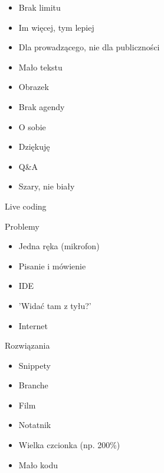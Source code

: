 \documentclass{beamer}
\begin{document}
\begin{frame}{}
	\begin{Large}
		\begin{itemize}
			\item Brak limitu
			\item Im więcej, tym lepiej
			\item Dla prowadzącego, nie dla publiczności
			\item Mało tekstu
			\item Obrazek
			\item Brak agendy
			\item O sobie
			\item Dziękuję
			\item Q\&A
			\item Szary, nie biały
		\end{itemize}
	\end{Large}
\end{frame}

\begin{frame}{}
	\begin{center}
		\Huge{Live coding}
	\end{center}
\end{frame}

\begin{frame}{}
	\begin{center}
		\Huge{Problemy}
	\end{center}
\end{frame}

\begin{frame}{}
	\begin{Large}
		\begin{itemize}
			\item Jedna ręka (mikrofon)
			\item Pisanie i mówienie
			\item IDE
			\item 'Widać tam z tyłu?'
			\item Internet
		\end{itemize}
	\end{Large}
\end{frame}

\begin{frame}{}
	\begin{center}
		\Huge{Rozwiązania}
	\end{center}
\end{frame}

\begin{frame}{}
	\begin{Large}
		\begin{itemize}
			\item Snippety
			\item Branche
			\item Film
			\item Notatnik
			\item Wielka czcionka (np. 200\%)
			\item Mało kodu
		\end{itemize}
	\end{Large}
\end{frame}
\end{document}
